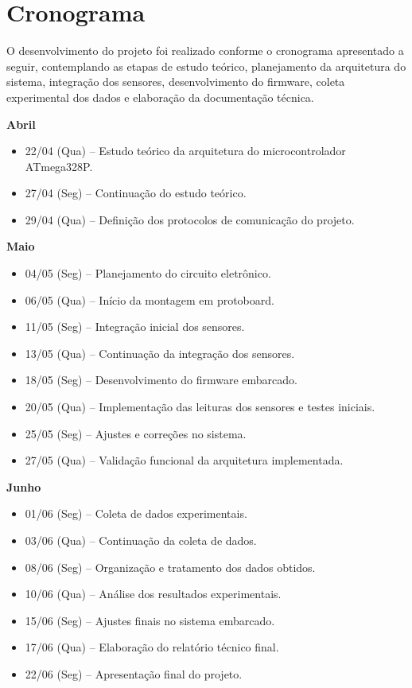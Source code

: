 \documentclass[a4paper,12pt]{article}
\begin{document}
\tableofcontents
\newpage

\section{Cronograma}

O desenvolvimento do projeto foi realizado conforme o cronograma apresentado a seguir, contemplando as etapas de estudo teórico, planejamento da arquitetura do sistema, integração dos sensores, desenvolvimento do firmware, coleta experimental dos dados e elaboração da documentação técnica.

\vspace{0.5cm}
\textbf{Abril}
\begin{itemize}
\item 22/04 (Qua) -- Estudo teórico da arquitetura do microcontrolador ATmega328P.
\item 27/04 (Seg) -- Continuação do estudo teórico.
\item 29/04 (Qua) -- Definição dos protocolos de comunicação do projeto.
\end{itemize}

\textbf{Maio}
\begin{itemize}
\item 04/05 (Seg) -- Planejamento do circuito eletrônico.
\item 06/05 (Qua) -- Início da montagem em protoboard.
\item 11/05 (Seg) -- Integração inicial dos sensores.
\item 13/05 (Qua) -- Continuação da integração dos sensores.
\item 18/05 (Seg) -- Desenvolvimento do firmware embarcado.
\item 20/05 (Qua) -- Implementação das leituras dos sensores e testes iniciais.
\item 25/05 (Seg) -- Ajustes e correções no sistema.
\item 27/05 (Qua) -- Validação funcional da arquitetura implementada.
\end{itemize}

\textbf{Junho}
\begin{itemize}
\item 01/06 (Seg) -- Coleta de dados experimentais.
\item 03/06 (Qua) -- Continuação da coleta de dados.
\item 08/06 (Seg) -- Organização e tratamento dos dados obtidos.
\item 10/06 (Qua) -- Análise dos resultados experimentais.
\item 15/06 (Seg) -- Ajustes finais no sistema embarcado.
\item 17/06 (Qua) -- Elaboração do relatório técnico final.
\item 22/06 (Seg) -- Apresentação final do projeto.
\end{itemize}
\end{document}
